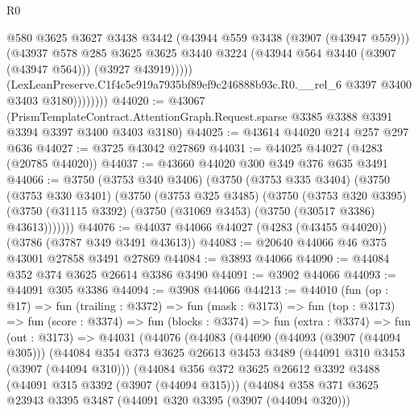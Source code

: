 \begin{lexlean}{R0}
\begin{coremodule}
                        @580
                        @3625
                        @3627
                        @3438
                        @3442
                        (@43944 @559 @3438 (@3907 (@43947 @559)))
                        (@43937
                          @578
                          @285
                          @3625
                          @3625
                          @3440
                          @3224
                          (@43944 @564 @3440 (@3907 (@43947 @564)))
                          (@3927 @43919)))))
                  (LexLeanPreserve.C1f4c5c919a7935bf89ef9c246888b93c.R0.__rel_6
                    @3397
                    @3400
                    @3403
                    @3180))))))))
@44020 := @43067
    (PrismTemplateContract.AttentionGraph.Request.sparse
      @3385
      @3388
      @3391
      @3394
      @3397
      @3400
      @3403
      @3180)
@44025 := @43614 @44020 @214 @257 @297 @636
@44027 := @3725 @43042 @27869
@44031 := @44025 @44027 (@4283 (@20785 @44020))
@44037 := @43660 @44020 @300 @349 @376 @635 @3491
@44066 := @3750
    (@3753 @340 @3406)
    (@3750
      (@3753 @335 @3404)
      (@3750
        (@3753 @330 @3401)
        (@3750
          (@3753 @325 @3485)
          (@3750
            (@3753 @320 @3395)
            (@3750 (@31115 @3392) (@3750 (@31069 @3453) (@3750 (@30517 @3386) @43613)))))))
@44076 := @44037 @44066 @44027 (@4283 (@43455 @44020)) (@3786 (@3787 @349 @3491 @43613))
@44083 := @20640 @44066 @46 @375 @43001 @27858 @3491 @27869
@44084 := @3893 @44066
@44090 := @44084 @352 @374 @3625 @26614 @3386 @3490
@44091 := @3902 @44066
@44093 := @44091 @305 @3386
@44094 := @3908 @44066
@44213 := @44010
    (fun (op : @17) =>
    fun (trailing : @3372) =>
    fun (mask : @3173) =>
    fun (top : @3173) =>
    fun (score : @3374) =>
    fun (blocks : @3374) =>
    fun (extra : @3374) =>
    fun (out : @3173) =>
    @44031
      (@44076
        (@44083
          (@44090
            (@44093 (@3907 (@44094 @305)))
            (@44084
              @354
              @373
              @3625
              @26613
              @3453
              @3489
              (@44091 @310 @3453 (@3907 (@44094 @310)))
              (@44084
                @356
                @372
                @3625
                @26612
                @3392
                @3488
                (@44091 @315 @3392 (@3907 (@44094 @315)))
                (@44084
                  @358
                  @371
                  @3625
                  @23943
                  @3395
                  @3487
                  (@44091 @320 @3395 (@3907 (@44094 @320)))

\end{coremodule}
\end{lexlean}
